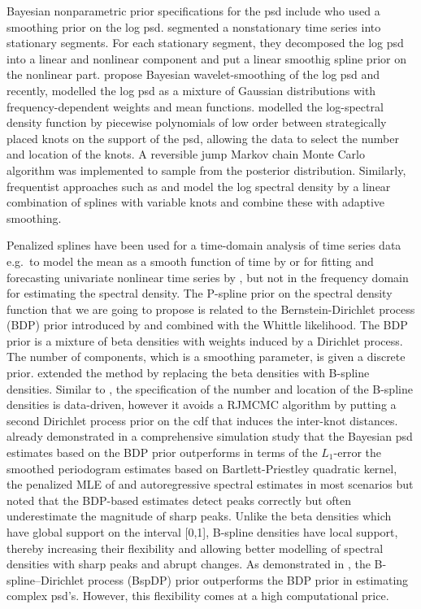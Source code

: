 \documentclass[twocolumn,final]{svjour3}
\begin{document}
Bayesian nonparametric prior specifications for the psd include \cite{Cart:1997}
who used a smoothing prior on the log psd.  \cite{Rosen:2012} segmented a nonstationary time series into stationary segments.  For each stationary segment, they decomposed the log psd into a linear and nonlinear component and  put a linear smoothig spline prior on the nonlinear part.  \cite{Pensky:2007} propose Bayesian wavelet-smoothing of the log psd and recently, \cite{Cadonna2017} modelled the log psd  as a mixture of Gaussian distributions with frequency-dependent weights and mean functions.
%
\cite{Gangopadhyay:1999} modelled the log-spectral density function by  piecewise polynomials of low order between strategically placed knots on the support of the psd,  allowing the data to select the number and location of the knots.  A reversible jump Markov chain Monte Carlo \citep[RJMCMC;][]{Green:1995} algorithm was implemented to sample from the posterior distribution.  Similarly, frequentist approaches such as \cite{Rodriguez} and \cite{Wood2017} model the log spectral density by a linear combination of splines with variable knots and combine these with adaptive smoothing. 

Penalized splines have been used for a time-domain analysis of time series data e.g.\ to model the mean as a smooth function of time by \cite{Krivobokova}  or for fitting and  forecasting univariate  nonlinear time series by \cite{Wegener}, but not in the frequency domain for estimating the spectral density.
The P-spline prior on the spectral density function that we are going to propose is related to the 
Bernstein-Dirichlet process (BDP) prior  introduced by \cite{Choudhuri:2004} and combined with the Whittle likelihood.  The BDP prior  is a mixture of beta densities with weights induced by a Dirichlet process.  The number of components, which is a smoothing parameter, is given a discrete prior.  \cite{Edwards2019} extended the method by replacing the beta densities with B-spline densities. Similar to 
\cite{Gangopadhyay:1999}, the specification of the number and location of the B-spline densities is data-driven, however it avoids a RJMCMC algorithm by putting a second Dirichlet process prior  on the cdf that induces the inter-knot distances. \cite{Choudhuri:2004} already demonstrated in a comprehensive simulation study  that the Bayesian psd estimates based on the BDP prior outperforms in terms of the $L_1$-error the smoothed periodogram estimates based on Bartlett-Priestley quadratic kernel, the penalized MLE of \cite{Pawitan} and autoregressive spectral estimates in most scenarios but noted that the BDP-based estimates detect peaks correctly but often underestimate the magnitude of sharp peaks.
Unlike the beta densities  which have global support on the interval [0,1], B-spline densities have local support, thereby increasing their flexibility and allowing better modelling of spectral densities with sharp peaks and abrupt changes.  As demonstrated in \cite{Edwards2019}, the B-spline--Dirichlet process (BspDP) prior outperforms the BDP prior in estimating complex psd's.  However, this flexibility comes at a high computational price.
\end{document}
